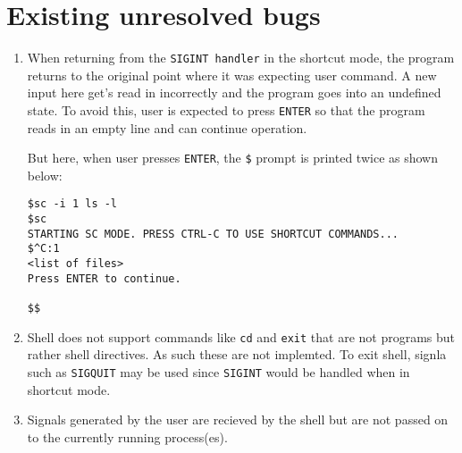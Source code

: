 \documentclass{article}
\begin{document}
\section{Existing unresolved bugs} \label{sec:bugs}
\begin{enumerate}
\item 
When returning from the \lstinline{SIGINT handler} in the shortcut mode, the program returns to the original point where it was expecting user command. A new input here get's read in incorrectly and the program goes into an undefined state. To avoid this, user is expected to press \lstinline{ENTER} so that the program reads in an empty line and can continue operation. 

But here, when user presses \lstinline{ENTER}, the \lstinline{$} prompt is printed twice as shown below:

\begin{lstlisting}
$sc -i 1 ls -l
$sc
STARTING SC MODE. PRESS CTRL-C TO USE SHORTCUT COMMANDS...
$^C:1
<list of files>
Press ENTER to continue.

$$
\end{lstlisting}

\item
Shell does not support commands like \lstinline{cd} and \lstinline{exit} that are not programs but rather shell directives. As such these are not implemted. To exit shell, signla such as \lstinline{SIGQUIT} may be used since \lstinline{SIGINT} would be handled when in shortcut mode.

\item
Signals generated by the user are recieved by the shell but are not passed on to the currently running process(es). 
\end{enumerate}
\end{document}
